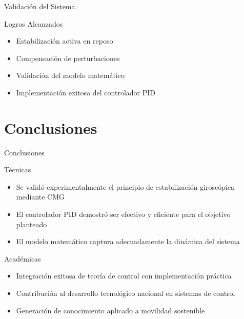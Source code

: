 \documentclass[10pt,xcolor={dvipsnames}]{beamer}
\begin{document}
\begin{frame}{Validación del Sistema}
\begin{block}{Logros Alcanzados}
\begin{itemize}
    \item \checkmark Estabilización activa en reposo
    \item \checkmark Compensación de perturbaciones
    \item \checkmark Validación del modelo matemático
    \item \checkmark Implementación exitosa del controlador PID
\end{itemize}
\end{block}

\vspace{0.3cm}
\begin{center}
\end{center}
\end{frame}

\section{Conclusiones}

\begin{frame}{Conclusiones}
\begin{block}{Técnicas}
\begin{itemize}
    \item Se validó experimentalmente el principio de estabilización giroscópica mediante CMG
    \item El controlador PID demostró ser efectivo y eficiente para el objetivo planteado
    \item El modelo matemático captura adecuadamente la dinámica del sistema
\end{itemize}
\end{block}

\begin{block}{Académicas}
\begin{itemize}
    \item Integración exitosa de teoría de control con implementación práctica
    \item Contribución al desarrollo tecnológico nacional en sistemas de control
    \item Generación de conocimiento aplicado a movilidad sostenible
\end{itemize}
\end{block}
\end{frame}
\end{document}
